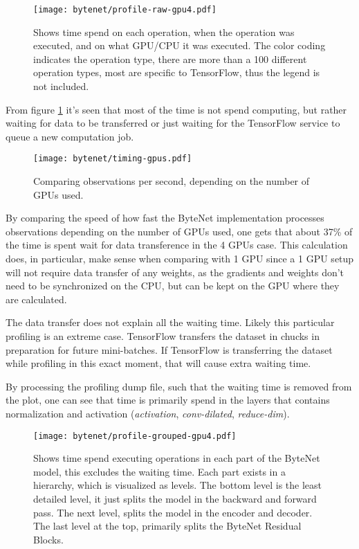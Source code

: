 \begin{figure}[h]
    \centering
    \texttt{[image: bytenet/profile-raw-gpu4.pdf]}
    \caption{Shows time spend on each operation, when the operation was executed, and on what GPU/CPU it was executed. The color coding indicates the operation type, there are more than a 100 different operation types, most are specific to TensorFlow, thus the legend is not included.}
    \label{fig:result:bytenet:profile-raw}
\end{figure}

From figure \ref{fig:result:bytenet:profile-raw} it's seen that most of the time is not spend computing, but rather waiting for data to be transferred or just waiting for the TensorFlow service to queue a new computation job.

\begin{figure}[h]
    \centering
    \texttt{[image: bytenet/timing-gpus.pdf]}
    \caption{Comparing observations per second, depending on the number of GPUs used.}
    \label{fig:result:bytenet:timing-gpus}
\end{figure}

By comparing the speed of how fast the ByteNet implementation processes observations depending on the number of GPUs used, one gets that about 37\% of the time is spent wait for data transference in the 4 GPUs case. This calculation does, in particular, make sense when comparing with 1 GPU since a 1 GPU setup will not require data transfer of any weights, as the gradients and weights don't need to be synchronized on the CPU, but can be kept on the GPU where they are calculated.

The data transfer does not explain all the waiting time. Likely this particular profiling is an extreme case. TensorFlow transfers the dataset in chucks in preparation for future mini-batches. If TensorFlow is transferring the dataset while profiling in this exact moment, that will cause extra waiting time.

By processing the profiling dump file, such that the waiting time is removed from the plot, one can see that time is primarily spend in the layers that contains normalization and activation (\textit{activation}, \textit{conv-dilated}, \textit{reduce-dim}). 

\begin{figure}[h]
    \centering
    \texttt{[image: bytenet/profile-grouped-gpu4.pdf]}
    \caption{Shows time spend executing operations in each part of the ByteNet model, this excludes the waiting time. Each part exists in a hierarchy, which is visualized as levels. The bottom level is the least detailed level, it just splits the model in the backward and forward pass. The next level, splits the model in the encoder and decoder. The last level at the top, primarily splits the ByteNet Residual Blocks.}
    \label{fig:result:bytenet:profile-grouped}
\end{figure}

